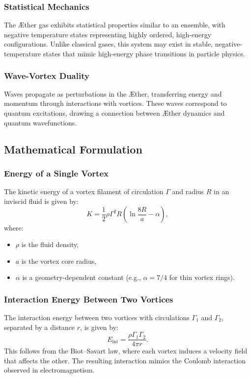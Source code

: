\documentclass[a4paper,10pt]{article}
\begin{document}
\subsubsection*{Statistical Mechanics}
The Æther gas exhibits statistical properties similar to an ensemble, with negative temperature states representing highly ordered, high-energy configurations. Unlike classical gases, this system may exist in stable, negative-temperature states that mimic high-energy phase transitions in particle physics.


\subsubsection*{Wave-Vortex Duality}
Waves propagate as perturbations in the Æther, transferring energy and momentum through interactions with vortices. These waves correspond to quantum excitations, drawing a connection between Æther dynamics and quantum wavefunctions.


\subsection*{Mathematical Formulation}
\subsubsection*{Energy of a Single Vortex}
The kinetic energy of a vortex filament of circulation $\Gamma$ and radius $R$ in an inviscid fluid is given by:
\begin{equation*}
K = \frac{1}{2} \rho \Gamma^2 R \left( \ln \frac{8R}{a} - \alpha \right),
\end{equation*}
where:
\begin{itemize}
\item $\rho$ is the fluid density,
\item $a$ is the vortex core radius,
\item $\alpha$ is a geometry-dependent constant (e.g., $\alpha = 7/4$ for thin vortex rings).
\end{itemize}


\subsubsection*{Interaction Energy Between Two Vortices}
The interaction energy between two vortices with circulations $\Gamma_1$ and $\Gamma_2$, separated by a distance $r$, is given by:
\begin{equation*}
E_\text{int} = \frac{\rho \Gamma_1 \Gamma_2}{4\pi r}.
\end{equation*}
This follows from the Biot–Savart law, where each vortex induces a velocity field that affects the other. The resulting interaction mimics the Coulomb interaction observed in electromagnetism.
\end{document}
